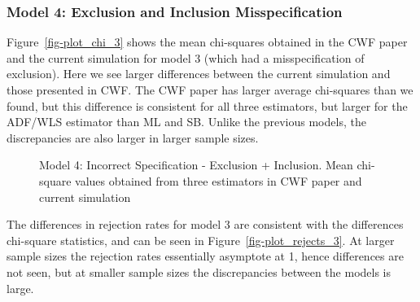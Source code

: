 \documentclass[
  letterpaper,
  DIV=11,
  numbers=noendperiod]{scrartcl}
\begin{document}
\subsubsection{Model 4: Exclusion and Inclusion
Misspecification}\label{model-4-exclusion-and-inclusion-misspecification}

Figure~\ref{fig-plot_chi_3} shows the mean chi-squares obtained in the
CWF paper and the current simulation for model 3 (which had a
misspecification of exclusion). Here we see larger differences between
the current simulation and those presented in CWF. The CWF paper has
larger average chi-squares than we found, but this difference is
consistent for all three estimators, but larger for the ADF/WLS
estimator than ML and SB. Unlike the previous models, the discrepancies
are also larger in larger sample sizes.

\begin{figure}[H]


\caption{\label{fig-plot_chi_4}Model 4: Incorrect Specification -
Exclusion + Inclusion. Mean chi-square values obtained from three
estimators in CWF paper and current simulation}

\end{figure}%

The differences in rejection rates for model 3 are consistent with the
differences chi-square statistics, and can be seen in
Figure~\ref{fig-plot_rejects_3}. At larger sample sizes the rejection
rates essentially asymptote at 1, hence differences are not seen, but at
smaller sample sizes the discrepancies between the models is large.
\end{document}
